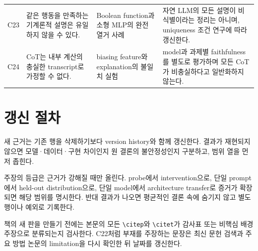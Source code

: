 \begin{longtable}{@{}p{}p{}p{}p{}@{}}
C23 & 같은 행동을 만족하는 기계론적 설명은 유일하지 않을 수 있다. & Boolean function과 소형 MLP의 완전 열거 사례 \citep{meloux2025identifiable} & 자연 LLM의 모든 설명이 비식별이라는 정리는 아니며, uniqueness 조건 연구에 따라 갱신한다. \\

C24 & CoT는 내부 계산의 충실한 transcript로 가정할 수 없다. & biasing feature와 explanation의 불일치 실험 \citep{turpin2023unfaithful} & model과 과제별 faithfulness를 별도로 평가하며 모든 CoT가 비충실하다고 일반화하지 않는다. \\
\bottomrule
\end{longtable}
\normalsize

\section{갱신 절차}

새 근거는 기존 행을 삭제하기보다 version history와 함께 갱신한다.
결과가 재현되지 않으면 모델·데이터·구현 차이인지 원 결론의 불안정성인지 구분하고, 범위 열을 먼저 좁힌다.

주장의 등급은 근거가 강해질 때만 올린다.
probe에서 intervention으로, 단일 prompt에서 held-out distribution으로, 단일 model에서 architecture transfer로 증거가 확장되면 해당 범위를 명시한다.
반대 결과가 나오면 평균적인 결론 속에 숨기지 않고 별도 행이나 예외로 기록한다.

\begin{studybox}
책의 새 판을 만들기 전에는 본문의 모든 \verb|\citep|와 \verb|\citet|가 감사표 또는 비핵심 배경 주장으로 분류되는지 검사한다.
C22처럼 부재를 주장하는 문장은 최신 문헌 검색과 주요 방법 논문의 limitation을 다시 확인한 뒤 날짜를 갱신한다.
\end{studybox}
